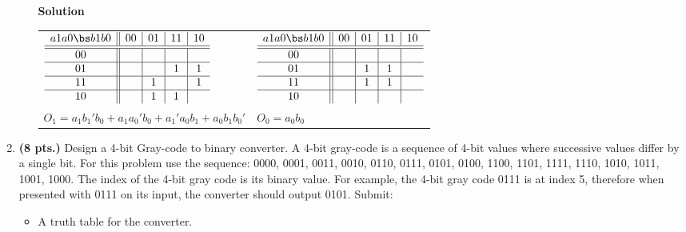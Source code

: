\begin{enumerate}
\begin{itemize}
                \begin{onlysolution}  \textbf{Solution} \itshape{
                        \begin{tabular}{ll}
                            $
                            \begin{array} {c||c|c|c|c}
                                a1 a0 \bs b1 b0 & 00 & 01 & 11 & 10 \\ \hline \hline
                                00        &    &    &    &    \\ \hline
                                01        &    &    & 1  & 1  \\ \hline
                                11        &    & 1  &    & 1  \\ \hline
                                10        &    & 1  & 1  &    \\
                            \end{array}$ &
                            $
                            \begin{array} {c||c|c|c|c}
                                a1 a0 \bs b1 b0 & 00 & 01 & 11 & 10 \\ \hline \hline
                                00        &    &    &    &    \\ \hline
                                01        &    & 1  & 1  &    \\ \hline
                                11        &    & 1  & 1  &    \\ \hline
                                10        &    &    &    &    \\
                            \end{array}$ \\
                            $O_1 = a_1b_1'b_0 + a_1a_0'b_0 + a_1'a_0b_1+a_0b_1b_0'$ & $O_0 = a_0b_0$ \\
                        \end{tabular}
                    }
                \end{onlysolution}

        \end{itemize}

    \item  \textbf{ (8 pts.)}
        Design a 4-bit Gray-code to binary converter.  A 4-bit gray-code is a
        sequence of 4-bit values where successive values differ by a single
        bit.  For this problem use the sequence: 0000, 0001, 0011, 0010,
        0110, 0111, 0101, 0100, 1100, 1101, 1111, 1110, 1010, 1011, 1001,
        1000.  The index of the 4-bit gray code is its binary value.  For
        example, the 4-bit gray code 0111 is at index 5, therefore when
        presented with 0111 on its input, the converter should output 0101.
        Submit:
        \begin{itemize}
            \item A truth table for the converter.


\end{itemize}
\end{enumerate}
